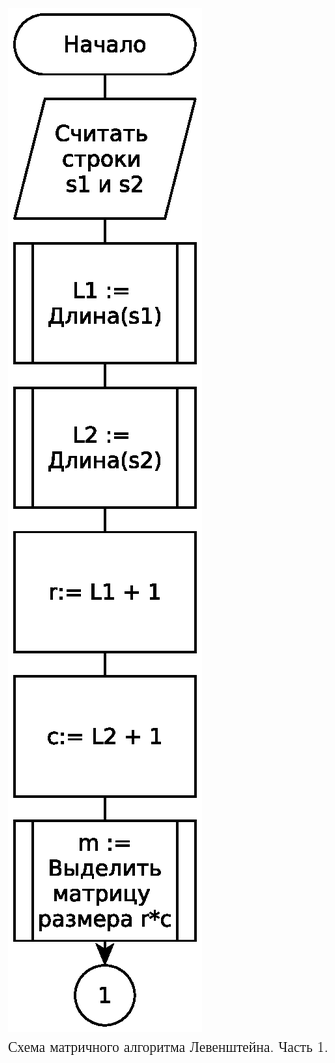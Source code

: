 \begin{figure}
    \centering
    \includegraphics[height=0.9\textheight]{schemes/levenshtein-iterative-eps-1}
    \caption{Схема матричного алгоритма Левенштейна. Часть 1.}
    \label{levenshtein-iterative-scheme-part-1}
\end{figure}


